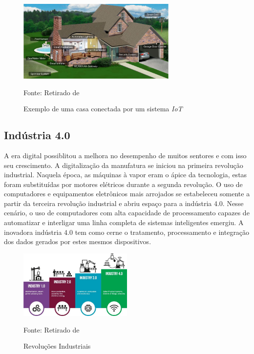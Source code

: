 \documentclass[../../layout.tex]{subfiles}
\begin{document}
\begin{figure}[H]
\centering
\caption{Exemplo de uma casa conectada por um sistema \emph{IoT}}
\includegraphics[width=0.7\textwidth]{assets/static/img/iothouse.jpg}
\label{fig:i2c}

\begin{minipage}{0.5\textwidth}
\raggedright \footnotesize Fonte: Retirado de  
\end{minipage}
\end{figure}

\subsection{Indústria 4.0}
\hspace*{3em}A era digital possiblitou a melhora no desempenho de muitos sentores e com isso seu crescimento. A digitalização da manufatura se iniciou na primeira revolução industrial. Naquela época, as máquinas à vapor eram o ápice da tecnologia, estas foram substituídas por motores elétricos durante a segunda revolução. O uso de computadores e equipamentos eletrônicos mais arrojados se estabeleceu somente a partir da terceira revolução industrial e abriu espaço para a indústria 4.0. Nesse cenário, o uso de  computadores com alta capacidade de processamento capazes de automatizar e interligar uma linha completa de sistemas inteligentes emergiu. A inovadora indústria 4.0 tem como cerne o tratamento, processamento e integração dos dados gerados por estes mesmos dispositivos. 
\begin{figure}[H]
\centering
\caption{Revoluções Industriais}
\includegraphics[width=0.5\textwidth]{assets/static/img/ind4.jpg}
\label{fig:i2c}

\begin{minipage}{0.7\textwidth}
\raggedright \footnotesize Fonte: Retirado de  
\end{minipage}
\end{figure}
\end{document}
